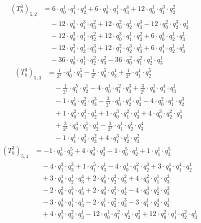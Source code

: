 \begin{align*}(T_{h}^3)_{5,2}&=6\cdot q_0^{1}\cdot q_1^{1}\cdot q_2^{4}+6\cdot q_0^{1}\cdot q_1^{1}\cdot q_3^{4}+12\cdot q_0^{1}\cdot q_1^{3}\cdot q_2^{2}\\
&\quad -12\cdot q_0^{1}\cdot q_1^{3}\cdot q_3^{2}+12\cdot q_0^{2}\cdot q_2^{1}\cdot q_3^{3}-12\cdot q_0^{2}\cdot q_2^{3}\cdot q_3^{1}\\
&\quad -12\cdot q_0^{3}\cdot q_1^{1}\cdot q_2^{2}+12\cdot q_0^{3}\cdot q_1^{1}\cdot q_3^{2}+6\cdot q_0^{4}\cdot q_2^{1}\cdot q_3^{1}\\
&\quad -12\cdot q_1^{2}\cdot q_2^{1}\cdot q_3^{3}+12\cdot q_1^{2}\cdot q_2^{3}\cdot q_3^{1}+6\cdot q_1^{4}\cdot q_2^{1}\cdot q_3^{1}\\
&\quad -36\cdot q_0^{1}\cdot q_1^{1}\cdot q_2^{2}\cdot q_3^{2}-36\cdot q_0^{2}\cdot q_1^{2}\cdot q_2^{1}\cdot q_3^{1}\end{align*}
\begin{align*}(T_{h}^3)_{5,3}&=\frac{1}{2^{1}}\cdot q_0^{1}\cdot q_3^{5}-\frac{1}{2^{1}}\cdot q_0^{5}\cdot q_3^{1}+\frac{1}{2^{1}}\cdot q_1^{1}\cdot q_2^{5}\\
&\quad -\frac{1}{2^{1}}\cdot q_1^{5}\cdot q_2^{1}-4\cdot q_0^{1}\cdot q_1^{2}\cdot q_3^{3}+\frac{3}{2^{1}}\cdot q_0^{1}\cdot q_1^{4}\cdot q_3^{1}\\
&\quad -1\cdot q_0^{1}\cdot q_2^{2}\cdot q_3^{3}-\frac{3}{2^{1}}\cdot q_0^{1}\cdot q_2^{4}\cdot q_3^{1}-4\cdot q_0^{2}\cdot q_1^{1}\cdot q_2^{3}\\
&\quad +1\cdot q_0^{2}\cdot q_1^{3}\cdot q_2^{1}+1\cdot q_0^{3}\cdot q_1^{2}\cdot q_3^{1}+4\cdot q_0^{3}\cdot q_2^{2}\cdot q_3^{1}\\
&\quad +\frac{3}{2^{1}}\cdot q_0^{4}\cdot q_1^{1}\cdot q_2^{1}-\frac{3}{2^{1}}\cdot q_1^{1}\cdot q_2^{1}\cdot q_3^{4}\\
&\quad -1\cdot q_1^{1}\cdot q_2^{3}\cdot q_3^{2}+4\cdot q_1^{3}\cdot q_2^{1}\cdot q_3^{2}\end{align*}
\begin{align*}(T_{h}^3)_{5,4}&=-1\cdot q_0^{1}\cdot q_2^{5}+4\cdot q_0^{3}\cdot q_2^{3}-1\cdot q_0^{5}\cdot q_2^{1}+1\cdot q_1^{1}\cdot q_3^{5}\\
&\quad -4\cdot q_1^{3}\cdot q_3^{3}+1\cdot q_1^{5}\cdot q_3^{1}-4\cdot q_0^{1}\cdot q_1^{2}\cdot q_2^{3}+3\cdot q_0^{1}\cdot q_1^{4}\cdot q_2^{1}\\
&\quad +3\cdot q_0^{1}\cdot q_2^{1}\cdot q_3^{4}+2\cdot q_0^{1}\cdot q_2^{3}\cdot q_3^{2}+4\cdot q_0^{2}\cdot q_1^{1}\cdot q_3^{3}\\
&\quad -2\cdot q_0^{2}\cdot q_1^{3}\cdot q_3^{1}+2\cdot q_0^{3}\cdot q_1^{2}\cdot q_2^{1}-4\cdot q_0^{3}\cdot q_2^{1}\cdot q_3^{2}\\
&\quad -3\cdot q_0^{4}\cdot q_1^{1}\cdot q_3^{1}-2\cdot q_1^{1}\cdot q_2^{2}\cdot q_3^{3}-3\cdot q_1^{1}\cdot q_2^{4}\cdot q_3^{1}\\
&\quad +4\cdot q_1^{3}\cdot q_2^{2}\cdot q_3^{1}-12\cdot q_0^{1}\cdot q_1^{2}\cdot q_2^{1}\cdot q_3^{2}+12\cdot q_0^{2}\cdot q_1^{1}\cdot q_2^{2}\cdot q_3^{1}\end{align*}
